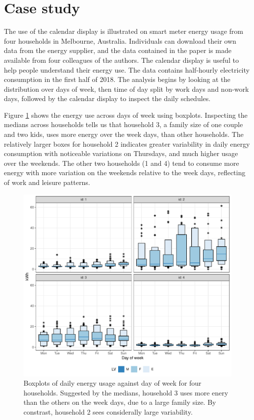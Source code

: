 \documentclass[12pt]{article}
\begin{document}
\hypertarget{sec:case}{%
\section{Case study}\label{sec:case}}

The use of the calendar display is illustrated on smart meter energy usage from four households in Melbourne, Australia. Individuals can download their own data from the energy supplier, and the data contained in the paper is made available from four colleagues of the authors. The calendar display is useful to help people understand their energy use. The data contains half-hourly electricity consumption in the first half of 2018. The analysis begins by looking at the distribution over days of week, then time of day split by work days and non-work days, followed by the calendar display to inspect the daily schedules.

Figure \ref{fig:dow} shows the energy use across days of week using boxplots. Inspecting the medians across households tells us that household 3, a family size of one couple and two kids, uses more energy over the week days, than other households. The relatively larger boxes for household 2 indicates greater variability in daily energy consumption with noticeable variations on Thursdays, and much higher usage over the weekends. The other two households (1 and 4) tend to consume more energy with more variation on the weekends relative to the week days, reflecting of work and leisure patterns.

\begin{figure}

{\centering \includegraphics[width=\textwidth]{figure/dow-1} 

}

\caption{Boxplots of daily energy usage against day of week for four households. Suggested by the medians, household 3 uses more enery than the others on the week days, due to a large family size. By constrast, household 2 sees considerally large variability.}\label{fig:dow}
\end{figure}
\end{document}

